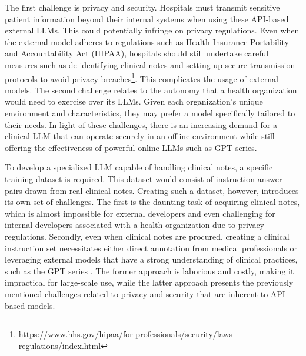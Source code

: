 \documentclass[11pt]{article}
\begin{document}
The first challenge is privacy and security.
Hospitals must transmit sensitive patient information beyond their internal systems when using these API-based external LLMs.
This could potentially infringe on privacy regulations.
Even when the external model adheres to regulations such as Health Insurance Portability and Accountability Act (HIPAA), hospitals should still undertake careful measures such as de-identifying clinical notes and setting up secure transmission protocols to avoid privacy breaches\footnote{\url{https://www.hhs.gov/hipaa/for-professionals/security/laws-regulations/index.html}}.
This complicates the usage of external models.
The second challenge relates to the autonomy that a health organization would need to exercise over its LLMs.
Given each organization's unique environment and characteristics, they may prefer a model specifically tailored to their needs.
In light of these challenges, there is an increasing demand for a clinical LLM that can operate securely in an offline environment while still offering the effectiveness of powerful online LLMs such as GPT series.

To develop a specialized LLM capable of handling clinical notes, a specific training dataset is required. 
This dataset would consist of instruction-answer pairs drawn from real clinical notes.
Creating such a dataset, however, introduces its own set of challenges.
The first is the daunting task of acquiring clinical notes, which is almost impossible for external developers and even challenging for internal developers associated with a health organization due to privacy regulations.
Secondly, even when clinical notes are procured, creating a clinical instruction set necessitates either direct annotation from medical professionals or leveraging external models that have a strong understanding of clinical practices, such as the GPT series \citep{lievin2022can,nori2023capabilities,dash2023evaluation,javaid2023chatgpt}. 
The former approach is laborious and costly, making it impractical for large-scale use, while the latter approach presents the previously mentioned challenges related to privacy and security that are inherent to API-based models.
\end{document}

